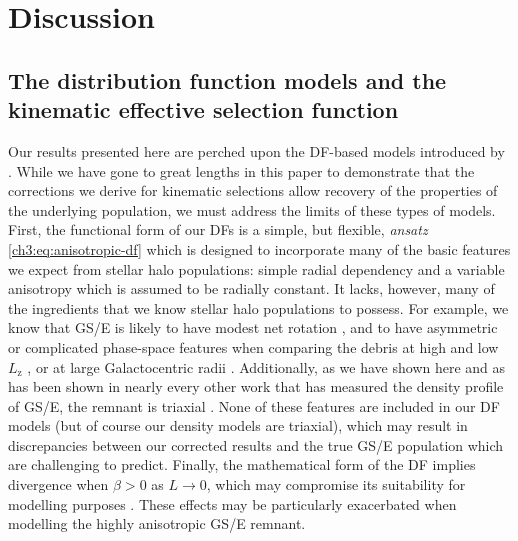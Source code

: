 \section{Discussion}
\label{ch3:sec:discussion}

\subsection{The distribution function models and the kinematic effective selection function}
\label{ch3:subsec:df-models-ksf-discussion}

Our results presented here are perched upon the DF-based models introduced by \cite{lane22}. While we have gone to great lengths in this paper to demonstrate that the corrections we derive for kinematic selections allow recovery of the properties of the underlying population, we must address the limits of these types of models. First, the functional form of our DFs is a simple, but flexible, \textit{ansatz} \eqref{ch3:eq:anisotropic-df} which is designed to incorporate many of the basic features we expect from stellar halo populations: simple radial dependency and a variable anisotropy which is assumed to be radially constant. It lacks, however, many of the ingredients that we know stellar halo populations to possess. For example, we know that GS/E is likely to have modest net rotation \parencite{helmi18,lancaster19,iorio21}, and to have asymmetric or complicated phase-space features when comparing the debris at high and low $L_\mathrm{z}$ \parencite{helmi18,naidu20}, or at large Galactocentric radii \parencite{chandra23}. Additionally, as we have shown here and as has been shown in nearly every other work that has measured the density profile of GS/E, the remnant is triaxial \parencite{iorio19,han22}. None of these features are included in our DF models (but of course our density models are triaxial), which may result in discrepancies between our corrected results and the true GS/E population which are challenging to predict. Finally, the mathematical form of the DF implies divergence when $\beta > 0$ as $L \rightarrow 0$, which may compromise its suitability for modelling purposes \parencite[as discussed by ][]{binney14d}. These effects may be particularly exacerbated when modelling the highly anisotropic GS/E remnant.

